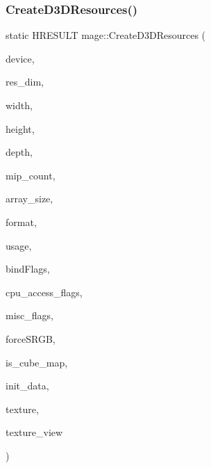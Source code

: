 \subsubsection{\texorpdfstring{Create\+D3\+D\+Resources()}{CreateD3DResources()}}
{\footnotesize\ttfamily static H\+R\+E\+S\+U\+LT mage\+::\+Create\+D3\+D\+Resources (\begin{DoxyParamCaption}\item[{\+\_\+\+In\+\_\+ \hyperlink{namespacemage_ae74f374780900893caa5555d1031fd79}{Com\+Ptr}$<$ I\+D3\+D11\+Device2 $>$}]{device,  }\item[{\+\_\+\+In\+\_\+ uint32\+\_\+t}]{res\+\_\+dim,  }\item[{\+\_\+\+In\+\_\+ size\+\_\+t}]{width,  }\item[{\+\_\+\+In\+\_\+ size\+\_\+t}]{height,  }\item[{\+\_\+\+In\+\_\+ size\+\_\+t}]{depth,  }\item[{\+\_\+\+In\+\_\+ size\+\_\+t}]{mip\+\_\+count,  }\item[{\+\_\+\+In\+\_\+ size\+\_\+t}]{array\+\_\+size,  }\item[{\+\_\+\+In\+\_\+ D\+X\+G\+I\+\_\+\+F\+O\+R\+M\+AT}]{format,  }\item[{\+\_\+\+In\+\_\+ D3\+D11\+\_\+\+U\+S\+A\+GE}]{usage,  }\item[{\+\_\+\+In\+\_\+ uint32\+\_\+t}]{bind\+Flags,  }\item[{\+\_\+\+In\+\_\+ uint32\+\_\+t}]{cpu\+\_\+access\+\_\+flags,  }\item[{\+\_\+\+In\+\_\+ uint32\+\_\+t}]{misc\+\_\+flags,  }\item[{\+\_\+\+In\+\_\+ bool}]{force\+S\+R\+GB,  }\item[{\+\_\+\+In\+\_\+ bool}]{is\+\_\+cube\+\_\+map,  }\item[{\+\_\+\+In\+\_\+reads\+\_\+opt\+\_\+(mip\+\_\+count $\ast$array\+\_\+size) D3\+D11\+\_\+\+S\+U\+B\+R\+E\+S\+O\+U\+R\+C\+E\+\_\+\+D\+A\+TA $\ast$}]{init\+\_\+data,  }\item[{\+\_\+\+Outptr\+\_\+opt\+\_\+ I\+D3\+D11\+Resource $\ast$$\ast$}]{texture,  }\item[{\+\_\+\+Outptr\+\_\+opt\+\_\+ I\+D3\+D11\+Shader\+Resource\+View $\ast$$\ast$}]{texture\+\_\+view }\end{DoxyParamCaption})\hspace{0.3cm}{\ttfamily [static]}}

\hypertarget{namespacemage_acbf88b358c9d52f8ff31917c5e04cd15}{}\label{namespacemage_acbf88b358c9d52f8ff31917c5e04cd15} 
